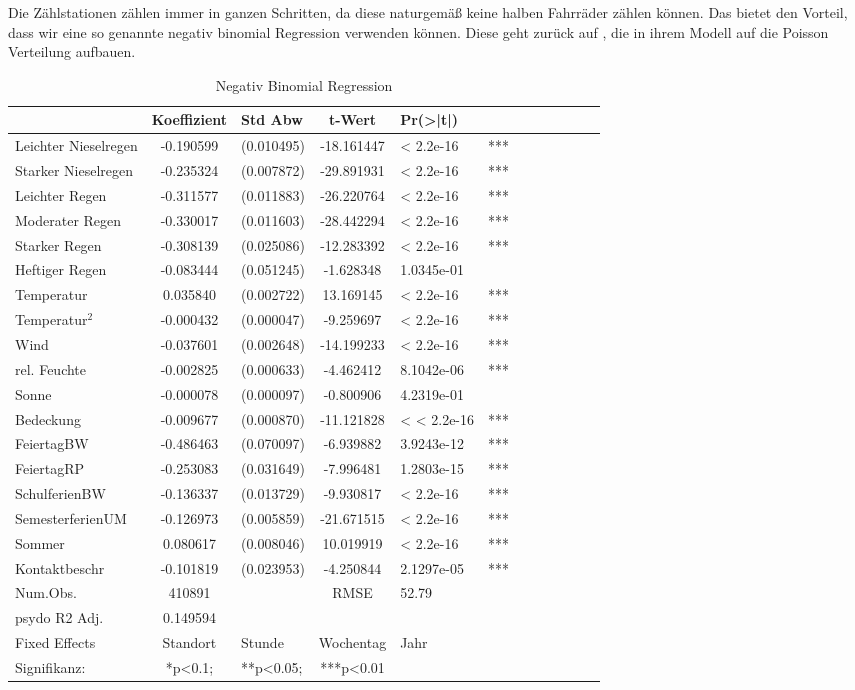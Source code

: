 \documentclass[a4paper,12pt]{thesis}
\begin{document}
Die Zählstationen zählen immer in ganzen Schritten, da diese naturgemäß keine halben Fahrräder zählen können. Das bietet den Vorteil, dass wir eine so genannte negativ binomial Regression verwenden können. Diese geht zurück auf \cite{Hausman1984}, die in ihrem Modell auf die Poisson Verteilung aufbauen.

\begin{table}[!htbp]
	\centering
	\caption{Negativ Binomial Regression}
	\begin{tabular}[t]{lc lc lc lc lc lc}
		\toprule
		& Koeffizient & Std Abw & t-Wert & Pr(>|t|) & \\
		\midrule
		Leichter Nieselregen & -0.190599 & (0.010495) & -18.161447 & < 2.2e-16 & *** \\
		Starker Nieselregen & -0.235324 & (0.007872) & -29.891931 & < 2.2e-16 & *** \\
		Leichter Regen & -0.311577 & (0.011883) & -26.220764 & < 2.2e-16 & *** \\
		Moderater Regen & -0.330017 & (0.011603) & -28.442294 & < 2.2e-16 & *** \\
		Starker Regen & -0.308139 & (0.025086) & -12.283392 & < 2.2e-16 & *** \\
		Heftiger Regen & -0.083444 & (0.051245) & -1.628348 & 1.0345e-01 & \\
		Temperatur & 0.035840 & (0.002722) & 13.169145 & < 2.2e-16 & *** \\
		Temperatur$^2$ & -0.000432 & (0.000047) & -9.259697 & < 2.2e-16 & *** \\
		Wind & -0.037601 & (0.002648) & -14.199233 & < 2.2e-16 & *** \\
		rel. Feuchte & -0.002825 & (0.000633) & -4.462412 & 8.1042e-06 & *** \\
		Sonne & -0.000078 & (0.000097) & -0.800906 & 4.2319e-01 & \\
		Bedeckung & -0.009677 & (0.000870) & -11.121828 & < < 2.2e-16 & *** \\
		FeiertagBW & -0.486463 & (0.070097) & -6.939882 & 3.9243e-12 & *** \\
		FeiertagRP & -0.253083 & (0.031649) & -7.996481 & 1.2803e-15 & *** \\
		SchulferienBW & -0.136337 & (0.013729) & -9.930817 & < 2.2e-16 & *** \\
		SemesterferienUM & -0.126973 & (0.005859) & -21.671515 & < 2.2e-16 & *** \\
		Sommer & 0.080617 & (0.008046) & 10.019919 & < 2.2e-16 & *** \\
		Kontaktbeschr & -0.101819 & (0.023953) & -4.250844 & 2.1297e-05 & *** \\
		\midrule
		Num.Obs. & 410891& & RMSE & 52.79 & \\
		psydo R2 Adj. & 0.149594 &  &  &  & \\
		\bottomrule
		Fixed Effects & Standort & Stunde & Wochentag & Jahr & \\
		Signifikanz: & *p<0.1; & **p<0.05; &***p<0.01 & &\\
	\end{tabular}
\label{reg2}
\end{table}
\end{document}
